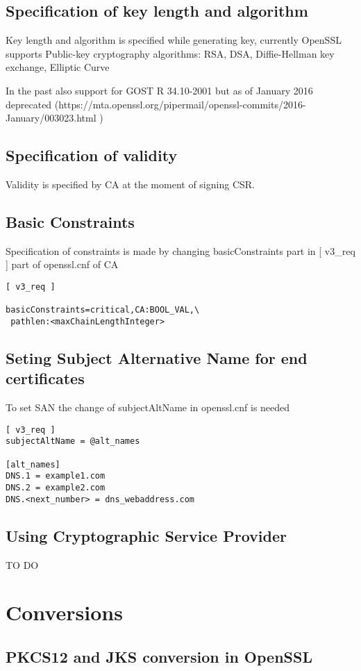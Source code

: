 \documentclass{report}
\begin{document}
\subsection{Specification of key length and algorithm}
Key length and algorithm is specified while generating key, currently OpenSSL supports Public-key cryptography algorithms:
RSA, DSA, Diffie-Hellman key exchange, Elliptic Curve

In the past also support for GOST R 34.10-2001 but as of January 2016 deprecated (https://mta.openssl.org/pipermail/openssl-commits/2016-January/003023.html )

\subsection{Specification of validity}
Validity is specified by CA at the moment of signing CSR.

\subsection{Basic Constraints}
Specification of constraints is made by changing basicConstraints part in [ v3_req ] part of openssl.cnf of CA
\begin{verbatim}
[ v3_req ]

basicConstraints=critical,CA:BOOL_VAL,\
 pathlen:<maxChainLengthInteger>
\end{verbatim}

\subsection{Seting Subject Alternative Name for end certificates}
To set SAN the change of subjectAltName in openssl.cnf is needed
\begin{verbatim}
[ v3_req ]
subjectAltName = @alt_names

[alt_names]
DNS.1 = example1.com
DNS.2 = example2.com
DNS.<next_number> = dns_webaddress.com
\end{verbatim}

\subsection{Using Cryptographic Service Provider}
TO DO

\section{Conversions}
\subsection{PKCS12 and JKS conversion in OpenSSL}
\end{document}
